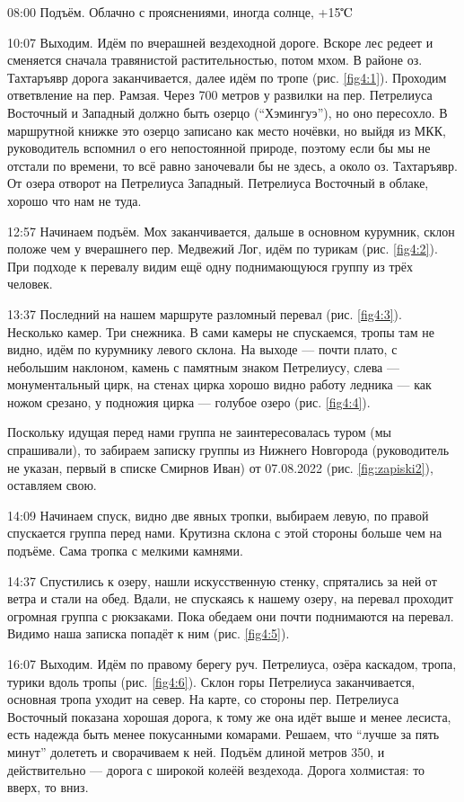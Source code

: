 08:00 Подъём.
Облачно с прояснениями, иногда солнце, +15$\tccentigrade$

10:07 Выходим.
Идём по вчерашней вездеходной дороге. Вскоре лес редеет и сменяется сначала травянистой растительностью, потом мхом.
В районе оз. Тахтаръявр дорога заканчивается, далее идём по тропе (рис. \ref{fig4:1}).
Проходим ответвление на пер. Рамзая. Через 700 метров у развилки на пер. Петрелиуса Восточный и Западный
должно быть озерцо (\enquote{Хэмингуэ}), но оно пересохло. В маршрутной книжке это озерцо записано как место ночёвки,
но выйдя из МКК, руководитель вспомнил о его непостоянной природе, поэтому если бы мы не отстали по времени,
то всё равно заночевали бы не здесь, а около оз. Тахтаръявр.
От озера отворот на Петрелиуса Западный. Петрелиуса Восточный в облаке, хорошо что нам не туда.

12:57 Начинаем подъём. Мох заканчивается, дальше в основном курумник, склон положе чем у вчерашнего пер. Медвежий Лог,
идём по турикам (рис. \ref{fig4:2}). При подходе к перевалу видим ещё одну поднимающуюся группу из трёх человек.

13:37 Последний на нашем маршруте разломный перевал (рис. \ref{fig4:3}). Несколько камер. Три снежника.
В сами камеры не спускаемся,
тропы там не видно, идём по курумнику левого склона. На выходе --- почти плато, с небольшим наклоном,
камень с памятным знаком Петрелиусу, слева --- монументальный цирк, на стенах цирка хорошо видно
работу ледника --- как ножом срезано, у подножия цирка --- голубое озеро (рис. \ref{fig4:4}).

Поскольку идущая перед нами группа не заинтересовалась туром (мы спрашивали), то забираем записку группы из
Нижнего Новгорода (руководитель не указан, первый в списке Смирнов Иван) от 07.08.2022 (рис. \ref{fig:zapiski2}), оставляем свою.

14:09 Начинаем спуск, видно две явных тропки, выбираем левую, по правой спускается группа перед нами.
Крутизна склона с этой стороны больше чем на подъёме. Сама тропка с мелкими камнями.

14:37 Спустились к озеру, нашли искусственную стенку, спрятались за ней от ветра и стали на обед.
Вдали, не спускаясь к нашему озеру, на перевал проходит огромная группа с рюкзаками.
Пока обедаем они почти поднимаются на перевал. Видимо наша записка попадёт к ним (рис. \ref{fig4:5}).

16:07 Выходим.
Идём по правому берегу руч. Петрелиуса, озёра каскадом, тропа, турики вдоль тропы (рис. \ref{fig4:6}).
Склон горы Петрелиуса заканчивается, основная тропа уходит на север. На карте, со стороны пер. Петрелиуса Восточный
показана хорошая дорога, к тому же она идёт выше и менее лесиста, есть надежда быть менее покусанными комарами.
Решаем, что \enquote{лучше за пять минут} долететь и сворачиваем к ней.
Подъём длиной метров 350, и действительно --- дорога с широкой колеёй вездехода. Дорога холмистая: то вверх, то вниз.

